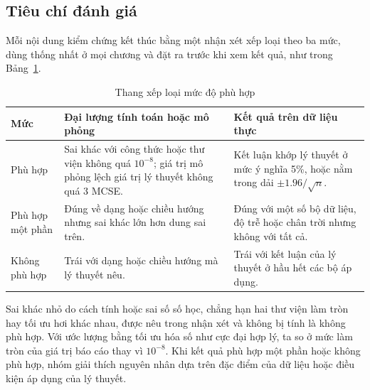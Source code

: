 \subsection{Tiêu chí đánh giá}

Mỗi nội dung kiểm chứng kết thúc bằng một nhận xét xếp loại theo ba mức, dùng thống nhất ở mọi chương và đặt ra trước khi xem kết quả, như trong Bảng~\ref{tab:thangdo}.

\begin{table}[H]
\centering\footnotesize
\caption{Thang xếp loại mức độ phù hợp}\label{tab:thangdo}
\renewcommand{\arraystretch}{1.25}
\begin{tabularx}{\linewidth}{@{}lXX@{}}
\toprule
Mức & Đại lượng tính toán hoặc mô phỏng & Kết quả trên dữ liệu thực \\
\midrule
Phù hợp & Sai khác với công thức hoặc thư viện không quá $10^{-8}$; giá trị mô phỏng lệch giá trị lý thuyết không quá $3$ MCSE. & Kết luận khớp lý thuyết ở mức ý nghĩa 5\%, hoặc nằm trong dải $\pm1.96/\sqrt n$. \\
Phù hợp một phần & Đúng về dạng hoặc chiều hướng nhưng sai khác lớn hơn dung sai trên. & Đúng với một số bộ dữ liệu, độ trễ hoặc chân trời nhưng không với tất cả. \\
Không phù hợp & Trái với dạng hoặc chiều hướng mà lý thuyết nêu. & Trái với kết luận của lý thuyết ở hầu hết các bộ áp dụng. \\
\bottomrule
\end{tabularx}
\end{table}

Sai khác nhỏ do cách tính hoặc sai số số học, chẳng hạn hai thư viện làm tròn hay tối ưu hơi khác nhau, được nêu trong nhận xét và không bị tính là không phù hợp. Với ước lượng bằng tối ưu hóa số như cực đại hợp lý, ta so ở mức làm tròn của giá trị báo cáo thay vì $10^{-8}$. Khi kết quả phù hợp một phần hoặc không phù hợp, nhóm giải thích nguyên nhân dựa trên đặc điểm của dữ liệu hoặc điều kiện áp dụng của lý thuyết.
